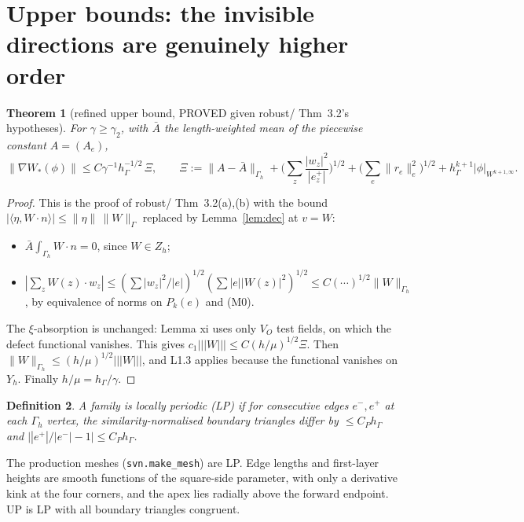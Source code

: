 \documentclass[11pt]{article}
\newtheorem{theorem}{Theorem}[section]
\newtheorem{definition}[theorem]{Definition}
\theoremstyle{remark}
\newcommand{\hG}{h_\Gamma}
\newcommand{\Gh}{\Gamma_h}
\newcommand{\ip}[2]{\langle #1,#2\rangle}
\begin{document}
\section{Upper bounds: the invisible directions are genuinely higher order}
\begin{theorem}[refined upper bound, PROVED given robust/ Thm~3.2's hypotheses]\label{thm:ub}
For $\gamma\ge\gamma_2$, with $\bar A$ the length-weighted mean of the piecewise constant $A=(A_e)$,
\[
\|\nabla W_\ast(\phi)\|\le C\gamma^{-1}\hG^{-1/2}\,\Xi,\qquad
\Xi:=\|A-\bar A\|_{\Gh}+\Big(\sum_z\frac{|w_z|^2}{|e^+_z|}\Big)^{1/2}+\Big(\sum_e\|r_e\|_e^2\Big)^{1/2}+\hG^{k+1}|\phi|_{W^{k+1,\infty}}.
\]
\end{theorem}
\begin{proof}
This is the proof of robust/ Thm~3.2(a),(b) with the bound $|\ip{\eta}{W\cdot n}|\le\|\eta\|\,\|W\|_\Gamma$ replaced by
Lemma~\ref{lem:dec} at $v=W$:
\begin{itemize}
\item $\bar A\int_{\Gh}W\cdot n=0$, since $W\in Z_h$;
\item $|\sum_zW(z)\cdot w_z|\le(\sum|w_z|^2/|e|)^{1/2}(\sum|e||W(z)|^2)^{1/2}\le C(\cdots)^{1/2}\|W\|_{\Gh}$, by equivalence of norms
on $P_k(e)$ and (M0).
\end{itemize}
The $\xi$-absorption is unchanged: Lemma xi uses only $V_O$ test fields, on which the defect functional vanishes. This gives
$c_1|||W|||\le C(h/\mu)^{1/2}\Xi$. Then $\|W\|_{\Gh}\le(h/\mu)^{1/2}|||W|||$, and L1.3 applies because the functional vanishes on
$Y_h$. Finally $h/\mu=\hG/\gamma$.
\end{proof}

\begin{definition}
A family is \emph{locally periodic} (LP) if for consecutive edges $e^-,e^+$ at each $\Gh$ vertex, the similarity-normalised
boundary triangles differ by $\le C_P\hG$ and $\big||e^+|/|e^-|-1\big|\le C_P\hG$.
\end{definition}
The production meshes (\texttt{svn.make\_mesh}) are LP. Edge lengths and first-layer heights are smooth functions of the
square-side parameter, with only a derivative kink at the four corners, and the apex lies radially above the forward
endpoint. \textsf{UP} is LP with all boundary triangles congruent.
\end{document}
